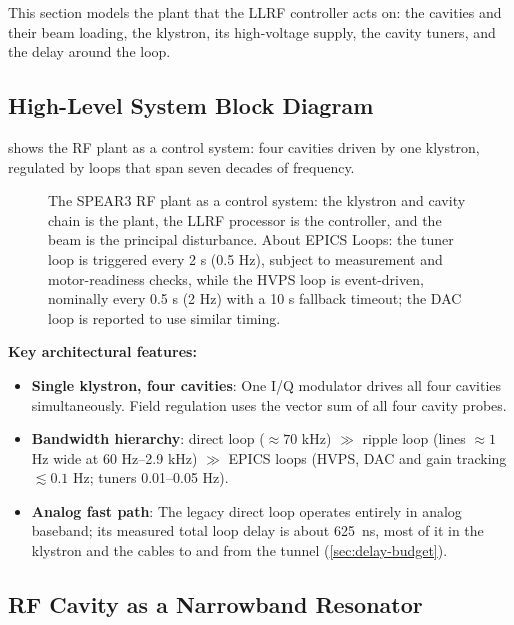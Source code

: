 This section models the plant that the LLRF controller acts on: the cavities and their beam loading, the klystron, its high-voltage supply, the cavity tuners, and the delay around the loop.

\subsection{High-Level System Block Diagram}\label{sec:plant-block}


 shows the RF plant as a control system: four cavities driven by one klystron, regulated by loops that span seven decades of frequency.

\begin{figure}[tbp]
\centering
\begin{fitpicture}\end{fitpicture}
\caption{The SPEAR3 RF plant as a control system: the klystron and cavity chain is the plant, the LLRF processor is the controller, and the beam is the principal disturbance. About EPICS Loops: the tuner loop is triggered every 2 s (0.5 Hz), subject to measurement and motor-readiness checks, while the HVPS loop is event-driven, nominally every 0.5 s (2 Hz) with a 10 s fallback timeout; the DAC loop is reported to use similar timing.}\label{fig:plant-overview}
\end{figure}

\textbf{Key architectural features:}

\begin{itemize}
\tightlist
\item
  \textbf{Single klystron, four cavities}: One I/Q modulator drives all four cavities simultaneously. Field regulation uses the vector sum of all four cavity probes.
\item
  \textbf{Bandwidth hierarchy}: direct loop (\(\approx 70\) kHz) \(\gg\) ripple loop (lines \(\approx 1\) Hz wide at 60 Hz--2.9 kHz) \(\gg\) EPICS loops (HVPS, DAC and gain tracking \(\lesssim 0.1\) Hz; tuners 0.01--0.05 Hz).
\item
  \textbf{Analog fast path}: The legacy direct loop operates entirely in analog baseband; its measured total loop delay is about \qty{625}{\nano\second}, most of it in the klystron and the cables to and from the tunnel (\cref{sec:delay-budget}).
\end{itemize}

\subsection{RF Cavity as a Narrowband Resonator}\label{sec:cavity}


